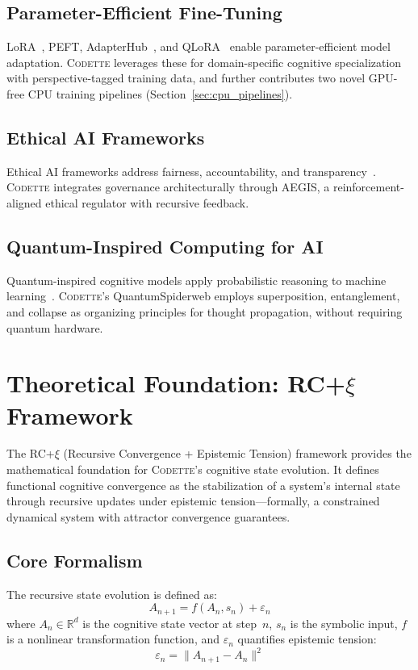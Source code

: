 \documentclass[11pt,a4paper]{article}
\newcommand{\rcxi}{RC+$\xi$}
\newcommand{\codette}{\textsc{Codette}}
\begin{document}
\subsection{Parameter-Efficient Fine-Tuning}
LoRA~\citep{hu2021lora}, PEFT, AdapterHub~\citep{pfeiffer2020adapterhub}, and QLoRA~\citep{dettmers2023qlora} enable parameter-efficient model adaptation. \codette{} leverages these for domain-specific cognitive specialization with perspective-tagged training data, and further contributes two novel GPU-free CPU training pipelines (Section~\ref{sec:cpu_pipelines}).

\subsection{Ethical AI Frameworks}
Ethical AI frameworks address fairness, accountability, and transparency~\citep{mehrabi2021survey}. \codette{} integrates governance architecturally through AEGIS, a reinforcement-aligned ethical regulator with recursive feedback.

\subsection{Quantum-Inspired Computing for AI}
Quantum-inspired cognitive models apply probabilistic reasoning to machine learning~\citep{schuld2018supervised}. \codette{}'s QuantumSpiderweb employs superposition, entanglement, and collapse as organizing principles for thought propagation, without requiring quantum hardware.

\section{Theoretical Foundation: \rcxi{} Framework}
\label{sec:theory}

The \rcxi{} (Recursive Convergence + Epistemic Tension) framework provides the mathematical foundation for \codette{}'s cognitive state evolution. It defines functional cognitive convergence as the stabilization of a system's internal state through recursive updates under epistemic tension---formally, a constrained dynamical system with attractor convergence guarantees.

\subsection{Core Formalism}
The recursive state evolution is defined as:
\begin{equation}
  A_{n+1} = f(A_n, s_n) + \varepsilon_n
  \label{eq:state_evolution}
\end{equation}
where $A_n \in \mathbb{R}^d$ is the cognitive state vector at step~$n$, $s_n$ is the symbolic input, $f$ is a nonlinear transformation function, and $\varepsilon_n$ quantifies epistemic tension:
\begin{equation}
  \varepsilon_n = \|A_{n+1} - A_n\|^2
  \label{eq:tension}
\end{equation}
\end{document}
